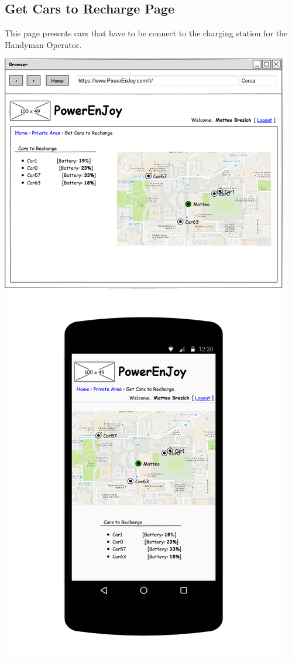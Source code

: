 \subsection{Get Cars to Recharge Page} This page presents cars that have to be connect to the charging station for the Handyman Operator.
\begin{center}
	\includegraphics[width=0.6\linewidth]{"img/ui/get-cars-recharge"}
\end{center}
\pagebreak

